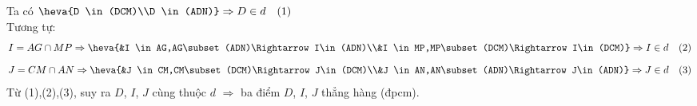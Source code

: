 \begin{bt}
{\begin{enumerate}
			Ta có $\heva{D \in (DCM)\\D \in (ADN)}\Rightarrow D\in d\quad (1)$\\
			Tương tự:\\
			$$I=AG\cap MP \Rightarrow \heva{&I \in AG,AG\subset (ADN)\Rightarrow I\in(ADN)\\&I \in MP,MP\subset (DCM)\Rightarrow I\in(DCM)}\Rightarrow I\in d\quad (2)$$
			$$J=CM\cap AN \Rightarrow \heva{&J \in CM,CM\subset (DCM)\Rightarrow J\in(DCM)\\&J \in AN,AN\subset (ADN)\Rightarrow J\in(ADN)}\Rightarrow J\in d\quad (3)$$
			Từ (1),(2),(3), suy ra $D$, $I$, $J$ cùng thuộc $d$ $\Rightarrow$ ba điểm $D$, $I$, $J$ thẳng hàng (đpcm).
		\end{enumerate}	
	}
\end{bt}

